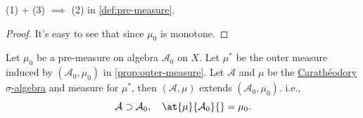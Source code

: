 \begin{lemma}
	(1) + (3) \(\implies \) (2) in \autoref{def:pre-measure}.
\end{lemma}
\begin{proof}
	It's easy to see that since \(\mu _0\) is monotone.
\end{proof}

\begin{theorem}\label{thm:Hahn-Kolmogorov-Thm}
	Let \(\mu_0\) be a pre-measure on algebra \(\mathcal{A} _0\) on \(X\).
	Let \(\mu^{*} \) be the outer measure induced by \((\mathcal{A} _0, \mu_0)\) in \autoref{prop:outer-measure}.
	Let \(\mathcal{A}\) and \(\mu\) be the \hyperref[thm:Caratheodory-extension-Thm]{Carathéodory \(\sigma\)-algebra} and measure for \(\mu^{*} \), then
	\((\mathcal{A} , \mu)\) extends \((\mathcal{A} _0, \mu_0)\). i.e.,
	\[
		\mathcal{A} \supset \mathcal{A} _0,\quad \at{\mu}{\mathcal{A}_0 }{} = \mu_0.
	\]
\end{theorem}
